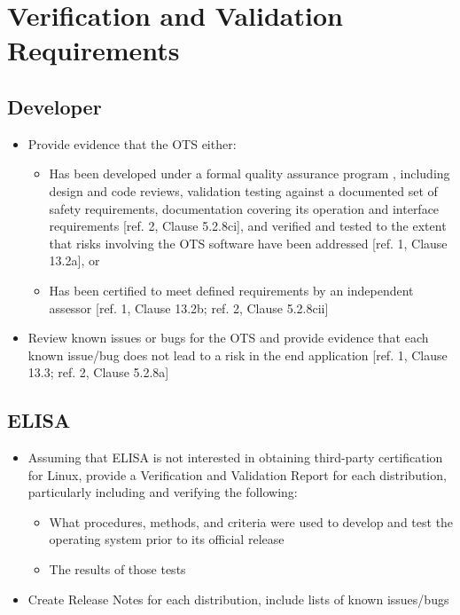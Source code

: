 \documentclass[12pt]{../Common_files/ElisaPaper}
\begin{document}
\section{Verification and Validation Requirements}
\subsection{Developer}

\begin{itemize}

\item Provide evidence that the OTS either:

\begin{itemize}

\item Has been developed under a formal quality assurance program , including design and code reviews, validation testing against a documented set of safety requirements, documentation covering its operation and interface requirements [ref. 2, Clause 5.2.8ci], and verified and tested to the extent that risks involving the OTS software have been addressed [ref. 1, Clause 13.2a], or

\item Has been certified to meet defined requirements by an independent assessor [ref. 1, Clause 13.2b; ref. 2, Clause 5.2.8cii]

\end{itemize}

\item Review known issues or bugs for the OTS and provide evidence that each known issue/bug does not lead to a risk in the end application [ref. 1, Clause 13.3; ref. 2, Clause 5.2.8a]

\end{itemize}

\subsection{ELISA}

\begin{itemize}

\item Assuming that ELISA is not interested in obtaining third-party certification for Linux, provide a Verification and Validation Report  for each distribution, particularly including and verifying the following:

\begin{itemize}

\item What procedures, methods, and criteria were used to develop and test the operating system prior to its official release

\item The results of those tests

\end{itemize}

\item Create Release Notes for each distribution, include lists of known issues/bugs

\end{itemize}
\end{document}
